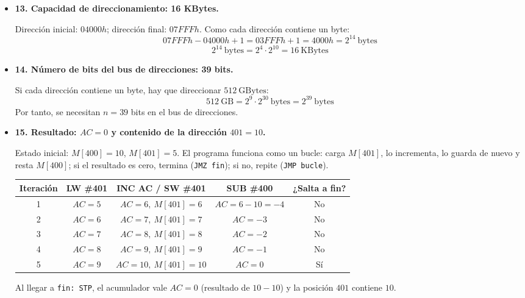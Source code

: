 \documentclass[10pt]{article}
\begin{document}
\begin{itemize}
  \item \textbf{13. Capacidad de direccionamiento: 16 KBytes.}

  Dirección inicial: $04000h$; dirección final: $07FFFh$. Como cada dirección contiene un byte:
  \[
    07FFFh - 04000h + 1 = 03FFFh + 1 = 4000h = 2^{14}\ \text{bytes}
  \]
  \[
    2^{14}\ \text{bytes} = 2^{4} \cdot 2^{10} = 16\ \text{KBytes}
  \]

  \item \textbf{14. Número de bits del bus de direcciones: 39 bits.}

  Si cada dirección contiene un byte, hay que direccionar $512\ \text{GBytes}$:
  \[
    512\ \text{GB} = 2^{9} \cdot 2^{30}\ \text{bytes} = 2^{39}\ \text{bytes}
  \]
  Por tanto, se necesitan $n = 39$ bits en el bus de direcciones.

  \item \textbf{15. Resultado: $AC = 0$ y contenido de la dirección $401 = 10$.}

  Estado inicial: $M[400] = 10$, $M[401] = 5$. El programa funciona como un bucle: carga $M[401]$, lo incrementa, lo guarda de nuevo y resta $M[400]$; si el resultado es cero, termina (\texttt{JMZ fin}); si no, repite (\texttt{JMP bucle}).

  \begin{center}
  \begin{tabular}{c c c c c}
    \hline
    \textbf{Iteración} & \textbf{LW \#401} & \textbf{INC AC / SW \#401} & \textbf{SUB \#400} & \textbf{¿Salta a fin?} \\
    \hline
    1  & $AC=5$  & $AC=6,\ M[401]=6$   & $AC=6-10=-4$ & No \\
    2  & $AC=6$  & $AC=7,\ M[401]=7$   & $AC=-3$      & No \\
    3  & $AC=7$  & $AC=8,\ M[401]=8$   & $AC=-2$      & No \\
    4  & $AC=8$  & $AC=9,\ M[401]=9$   & $AC=-1$      & No \\
    5  & $AC=9$  & $AC=10,\ M[401]=10$ & $AC=0$       & Sí \\
    \hline
  \end{tabular}
  \end{center}

  Al llegar a \texttt{fin: STP}, el acumulador vale $AC = 0$ (resultado de $10 - 10$) y la posición $401$ contiene $10$.
\end{itemize}
\end{document}
